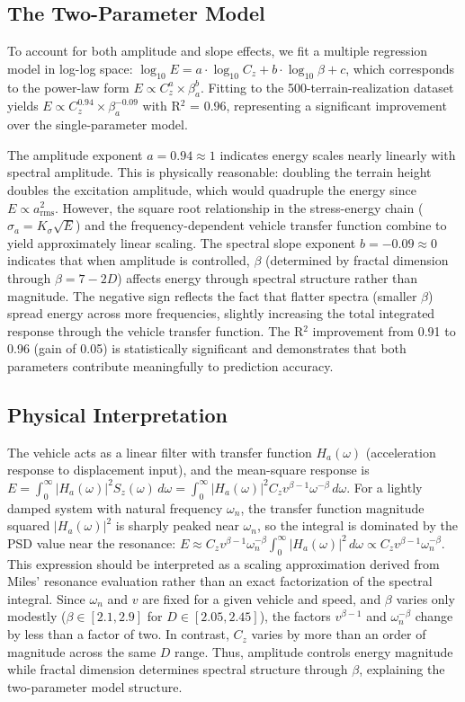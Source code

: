 \documentclass[11pt]{article}
\begin{document}
\subsection{The Two-Parameter Model}

To account for both amplitude and slope effects, we fit a multiple regression model in log-log space: $\log_{10} E = a \cdot \log_{10} C_z + b \cdot \log_{10} \beta + c$, which corresponds to the power-law form $E \propto C_z^a \times \beta_a^b$. Fitting to the 500-terrain-realization dataset yields $E \propto C_z^{0.94} \times \beta_a^{-0.09}$ with R$^2$ = 0.96, representing a significant improvement over the single-parameter model.

The amplitude exponent $a = 0.94 \approx 1$ indicates energy scales nearly linearly with spectral amplitude. This is physically reasonable: doubling the terrain height doubles the excitation amplitude, which would quadruple the energy since $E \propto a_{\text{rms}}^2$. However, the square root relationship in the stress-energy chain ($\sigma_a = K_\sigma \sqrt{E}$) and the frequency-dependent vehicle transfer function combine to yield approximately linear scaling. The spectral slope exponent $b = -0.09 \approx 0$ indicates that when amplitude is controlled, $\beta$ (determined by fractal dimension through $\beta = 7-2D$) affects energy through spectral structure rather than magnitude. The negative sign reflects the fact that flatter spectra (smaller $\beta$) spread energy across more frequencies, slightly increasing the total integrated response through the vehicle transfer function. The R$^2$ improvement from 0.91 to 0.96 (gain of 0.05) is statistically significant and demonstrates that both parameters contribute meaningfully to prediction accuracy.

\subsection{Physical Interpretation}

The vehicle acts as a linear filter with transfer function $H_a(\omega)$ (acceleration response to displacement input), and the mean-square response is $E = \int_0^\infty |H_a(\omega)|^2 S_z(\omega) \, d\omega = \int_0^\infty |H_a(\omega)|^2 C_z v^{\beta-1} \omega^{-\beta} \, d\omega$. For a lightly damped system with natural frequency $\omega_n$, the transfer function magnitude squared $|H_a(\omega)|^2$ is sharply peaked near $\omega_n$, so the integral is dominated by the PSD value near the resonance: $E \approx C_z v^{\beta-1} \omega_n^{-\beta} \int_0^\infty |H_a(\omega)|^2 \, d\omega \propto C_z v^{\beta-1} \omega_n^{-\beta}$. This expression should be interpreted as a scaling approximation derived from Miles' resonance evaluation rather than an exact factorization of the spectral integral. Since $\omega_n$ and $v$ are fixed for a given vehicle and speed, and $\beta$ varies only modestly ($\beta \in [2.1, 2.9]$ for $D \in [2.05, 2.45]$), the factors $v^{\beta-1}$ and $\omega_n^{-\beta}$ change by less than a factor of two. In contrast, $C_z$ varies by more than an order of magnitude across the same $D$ range. Thus, amplitude controls energy magnitude while fractal dimension determines spectral structure through $\beta$, explaining the two-parameter model structure.
\end{document}
